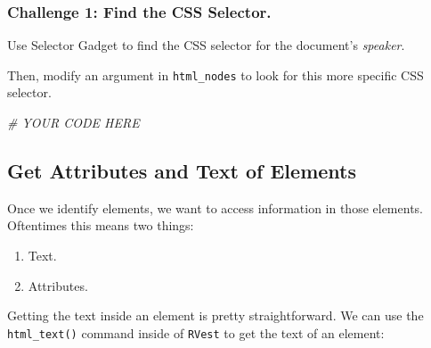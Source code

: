 \documentclass[]{book}
\newenvironment{Shaded}{\begin{snugshade}}{\end{snugshade}}
\newcommand{\KeywordTok}[1]{\textcolor[rgb]{0.13,0.29,0.53}{\textbf{#1}}}
\newcommand{\StringTok}[1]{\textcolor[rgb]{0.31,0.60,0.02}{#1}}
\newcommand{\CommentTok}[1]{\textcolor[rgb]{0.56,0.35,0.01}{\textit{#1}}}
\newcommand{\OperatorTok}[1]{\textcolor[rgb]{0.81,0.36,0.00}{\textbf{#1}}}
\newcommand{\NormalTok}[1]{#1}
\providecommand{\tightlist}{%
  \setlength{\itemsep}{0pt}\setlength{\parskip}{0pt}}
\begin{document}
\subsubsection*{Challenge 1: Find the CSS
Selector.}\label{challenge-1-find-the-css-selector.}

Use Selector Gadget to find the CSS selector for the document's
\emph{speaker}.

Then, modify an argument in \texttt{html\_nodes} to look for this more
specific CSS selector.

\begin{Shaded}
\begin{Highlighting}[]
\CommentTok{# YOUR CODE HERE}
\end{Highlighting}
\end{Shaded}

\subsection{Get Attributes and Text of
Elements}\label{get-attributes-and-text-of-elements}

Once we identify elements, we want to access information in those
elements. Oftentimes this means two things:

\begin{enumerate}
\def\labelenumi{\arabic{enumi})}
\tightlist
\item
  Text.
\item
  Attributes.
\end{enumerate}

Getting the text inside an element is pretty straightforward. We can use
the \texttt{html\_text()} command inside of \texttt{RVest} to get the
text of an element:

\begin{Shaded}
\end{Shaded}
\end{document}
